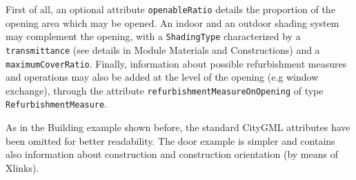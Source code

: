 \documentclass[a4paper,12pt]{article}
\begin{document}
First of all, an optional attribute \texttt{openableRatio} details the
proportion of the opening area which may be opened. An indoor and an
outdoor shading system may complement the opening, with a
\texttt{ShadingType} characterized by a \texttt{transmittance} (see
details in Module Materials and Constructions) and a
\texttt{maximumCoverRatio}. Finally, information about possible
refurbishment measures and operations may also be added at the level of
the opening (e.g window exchange), through the attribute
\texttt{refurbishmentMeasureOnOpening} of type
\texttt{RefurbishmentMeasure}.

As in the Building example shown before, the standard CityGML attributes
have been omitted for better readability. The door example is simpler
and contains also information about construction and construction
orientation (by means of Xlinks).
\end{document}
